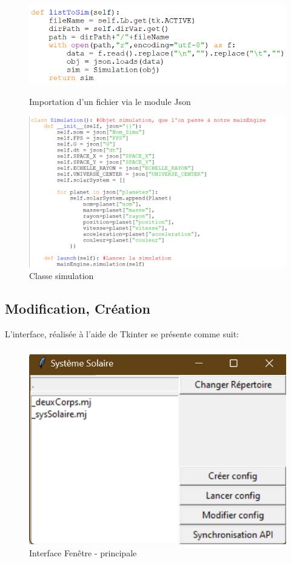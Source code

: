 \documentclass[a4paper, 12pt]{article}
\begin{document}
	
	\begin{figure}[H]
    	\centering
    	\begin{minipage}{0.5\linewidth}
        	\centering
        	\includegraphics[width=\linewidth]{img/toJson.png}
        	\caption{\label{fig:TOJSON} Importation d'un fichier via le module Json}
    	\end{minipage}
    	\hspace{0.05\linewidth}  %
    	\begin{minipage}{0.38\linewidth}
        	\centering
        	\includegraphics[width=\linewidth]{img/simulationClasse.png}
        	\caption{\label{fig:simClasse} Classe simulation} 
    	\end{minipage}
	\end{figure}
%
%
\subsection{Modification, Création}
	L'interface, réalisée à l'aide de Tkinter se présente comme suit:
    \begin{figure}[H]
		\centering
		\includegraphics[width=0.2\linewidth]{img/mainInterface.png}
		\caption{\label{fig: IntMain} Interface Fenêtre - principale}  
	\end{figure}
\end{document}
